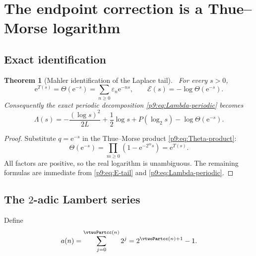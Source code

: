 \documentclass[11pt]{article}
\numberwithin{equation}{section}
\newtheorem{theorem}{Theorem}[section]
\theoremstyle{definition}
\theoremstyle{remark}
\newcommand{\e}{\mathrm e}
\begin{document}
\section{The endpoint correction is a Thue--Morse logarithm}
\label{p9:sec:endpoint-TM}

\subsection{Exact identification}

\begin{theorem}[Mahler identification of the Laplace tail]\label{p9:thm:tail-TM}
\statusN\ For every $s>0$,
\begin{equation}
 \boxed{
 \e^{T(s)}=\Theta(\e^{-s})
 =\sum_{n\ge0}\varepsilon_n\e^{-ns},
 \qquad
 \mathcal E(s)=-\log\Theta(\e^{-s}).}                      \label{p9:eq:tail-TM}
\end{equation}
Consequently the exact periodic decomposition \eqref{p9:eq:Lambda-periodic} becomes
\begin{equation}
 \boxed{
 \Lambda(s)=-\frac{(\log s)^2}{2L}+\frac12\log s
 +P(\log_2s)-\log\Theta(\e^{-s}).}                         \label{p9:eq:Lambda-TM}
\end{equation}
\end{theorem}

\begin{proof}
Substitute $q=\e^{-s}$ in the Thue--Morse product \eqref{p9:eq:Theta-product}:
\[
 \Theta(\e^{-s})=\prod_{m\ge0}(1-\e^{-2^ms})=\e^{T(s)}.
\]
All factors are positive, so the real logarithm is unambiguous.  The remaining formulas are
immediate from \eqref{p9:eq:E-tail} and \eqref{p9:eq:Lambda-periodic}.
\end{proof}

\subsection{The $2$-adic Lambert series}
Define
\begin{equation}
 a(n)=\sum_{j=0}^{\vtwoPartcc(n)}2^j=2^{\vtwoPartcc(n)+1}-1.           \label{p9:eq:a-n}
\end{equation}
\end{document}
